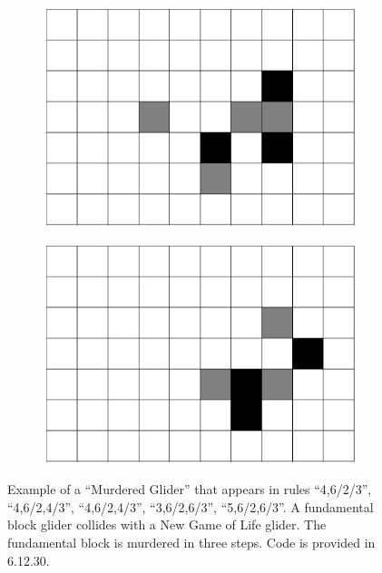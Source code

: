 \documentclass[12pt]{article}
\numberwithin{figure}{section} %
\begin{document}
\begin{figure}[htbp]
\begin{subfigure}{0.23\textwidth}
     	\subcaption{}
   	\end{subfigure}
     	\begin{subfigure}{0.23\textwidth}
     	\centering
     	\includegraphics[width=\linewidth]{Section4/33.2}
     	\subcaption{}
   	\end{subfigure}
        	\begin{subfigure}{0.23\textwidth}
     	\centering
     	\includegraphics[width=\linewidth]{Section4/33.3}
     	\subcaption{}
   	\end{subfigure}
   \caption{Example of a “Murdered Glider” that appears in rules “4,6/2/3”, “4,6/2,4/3”, “4,6/2,4/3”, “3,6/2,6/3”, “5,6/2,6/3”. A fundamental block glider collides with a New Game of Life glider. The fundamental block is murdered in three steps. Code is provided in 6.12.30. }
   \label{fig:murder glider two}
\end{figure}
\end{document}
